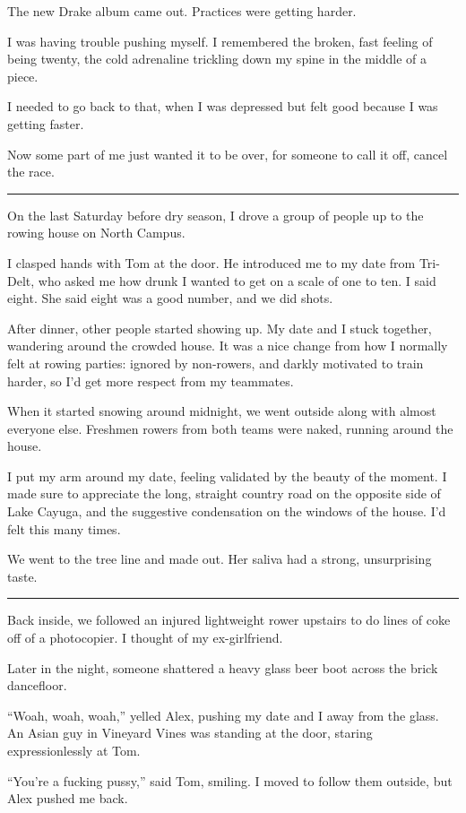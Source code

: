 The new Drake album came out. Practices were getting harder.

I was having trouble pushing myself.  I remembered the broken, fast feeling of
being twenty, the cold adrenaline trickling down my spine in the middle of a
piece.

I needed to go back to that, when I was depressed but felt good because I was
getting faster.

Now some part of me just wanted it to be over, for someone to call it off,
cancel the race.

\plainfancybreak{12pt}{2}{}

On the last Saturday before dry season, I drove a group of people up to the
rowing house on North Campus.

I clasped hands with Tom at the door.  He introduced me to my date from
Tri-Delt, who asked me how drunk I wanted to get on a scale of one to ten. I
said eight.  She said eight was a good number, and we did shots.

After dinner, other people started showing up.  My date and I stuck together,
wandering around the crowded house.  It was a nice change from how I normally
felt at rowing parties: ignored by non-rowers, and darkly motivated to train
harder, so I'd get more respect from my teammates.

When it started snowing around midnight, we went outside along with almost
everyone else.  Freshmen rowers from both teams were naked, running around the
house.

I put my arm around my date, feeling validated by the beauty of the moment.  I
made sure to appreciate the long, straight country road on the opposite side of
Lake Cayuga, and the suggestive condensation on the windows of the house.  I'd
felt this many times.

We went to the tree line and made out.  Her saliva had a strong, unsurprising
taste.

\plainfancybreak{12pt}{2}{}

Back inside, we followed an injured lightweight rower upstairs to do lines of
coke off of a photocopier.  I thought of my ex-girlfriend.

Later in the night, someone shattered a heavy glass beer boot across the brick
dancefloor.

``Woah, woah, woah,'' yelled Alex, pushing my date and I away from the glass.
An Asian guy in Vineyard Vines was standing at the door, staring
expressionlessly at Tom.

``You're a fucking pussy,'' said Tom, smiling.  I moved to follow them outside,
but Alex pushed me back.

